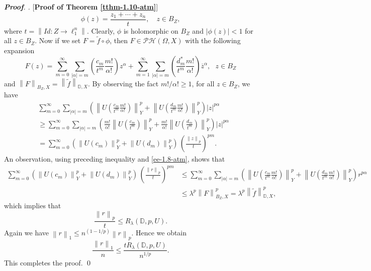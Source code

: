 \documentclass[a4paper,11pt, reqno]{amsart}
\theoremstyle{definition}
\newenvironment{pf}[1][]{%
	\vskip 3mm
	\noindent
	\ifthenelse{\equal{#1}{}}%
	{{\slshape {\bf Proof}. }}%
	{{\slshape #1.} }%
}%
{\qed\bigskip}
\newcommand{\norm}[1]{\left\lVert#1\right\rVert}
\begin{document}
\begin{pf} [{\bf Proof of Theorem \ref{tthm-1.10-atm}}]
\begin{equation}
		\phi(z)=\frac{z_1+\cdots+z_n}{t},\quad z\in B_{Z},
	\end{equation}
	where $t= \norm{Id: Z \rightarrow \ell^n_{1}}$. Clearly, $\phi$ is holomorphic on $B_{Z}$ and $|\phi(z)|<1$ for all $z \in B_{Z}$.
	Now if we set $F=\tilde{f} \circ \phi $, then $F \in \mathcal{PH}(\Omega,X)$ with the following expansion 
	\begin{equation*}
		F(z)=\sum_{m=0}^{\infty} \sum_{|\alpha|=m} \left(\frac{c_{m}}{t^m} \frac{m!}{\alpha!}\right) z^{\alpha} +  \sum_{m=1}^{\infty} \sum_{|\alpha|=m} \left(\frac{d^{*}_{m}}{t^m} \frac{m!}{\alpha!}\right) \overline{z}^{\alpha},\,\, \,\, z \in B_{Z}
	\end{equation*}
	and $\norm{F}_{B_{Z},X}=\norm{\tilde{f}}_{\mathbb{D},X}$.
	By observing the fact $m!/\alpha! \geq 1$, for all $z\in B_{Z}$, we have
	\begin{align*}
		&\sum_{m=0}^{\infty} \sum_{|\alpha|=m} \left(\norm{U\left(\frac{c_{m}}{t^m} \frac{m!}{\alpha!}\right)}^p_{Y} + \norm{U\left(\frac{d_{m}}{t^m} \frac{m!}{\alpha!}\right)}^p_{Y}\right)|z|^{p \alpha} \nonumber \\
		& \geq \sum_{m=0}^{\infty} \sum_{|\alpha|=m} \left(\frac{m!}{\alpha!}\norm{U\left(\frac{c_{m}}{t^m} \right)}^p_{Y} + \frac{m!}{\alpha!}\norm{U\left(\frac{d_{m}}{t^m} \right)}^p_{Y}\right)|z|^{p \alpha} \nonumber \\
		& = \sum_{m=0}^{\infty} (\norm{U(c_{m})}^p_{Y} + \norm{U(d_{m})}^p_{Y})\, \left(\frac{\norm{z}_{p}}{t}\right)^{p m}.
	\end{align*}
	An observation, using preceding inequality and \eqref{ee-1.8-atm}, shows that
	\begin{align*}
		\sum_{m=0}^{\infty} (\norm{U(c_{m})}^p_{Y} + \norm{U(d_{m})}^p_{Y})\, \left(\frac{\norm{r}_{p}}{t}\right)^{p m}
		&\leq \sum_{m=0}^{\infty} \sum_{|\alpha|=m} \left(\norm{U\left(\frac{c_{m}}{t^m} \frac{m!}{\alpha!}\right)}^p_{Y} + \norm{U\left(\frac{d_{m}}{t^m} \frac{m!}{\alpha!}\right)}^p_{Y}\right)r^{p \alpha} \nonumber \\
		&\leq \lambda^p  \norm{F}^p_{B_{Z},X}=\lambda^p \norm{\tilde{f}}^p_{\mathbb{D},X},
	\end{align*}
	which implies that 
	$$
	\frac{\norm{r}_{p}}{t} \leq R_\lambda(\mathbb{D},p,U).
	$$ Again we have $\norm{r}_{1}\leq n^{(1-1/p)}\norm{r}_{p}$. Hence we obtain $$
	\frac{\norm{r}_{1}}{n}\leq \frac{t R_\lambda(\mathbb{D},p,U)}{n^{1/p}}.
	$$ 
	This completes the proof.
\end{pf}
\end{document}

